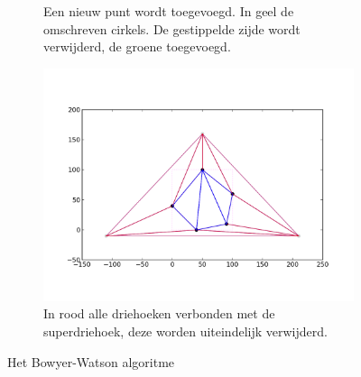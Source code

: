 \begin{figure}
\begin{subfigure}{0.4\textwidth}
		\caption{Een nieuw punt wordt toegevoegd. In geel de omschreven cirkels. De gestippelde zijde wordt verwijderd, de groene toegevoegd.}
		\label{bowyer-watson-b}
	\end{subfigure}
		\begin{subfigure}{0.4\textwidth}
		\includegraphics[width=\textwidth]{bowyer-watson_verwijderen}
		\caption{In rood alle driehoeken verbonden met de superdriehoek, deze worden uiteindelijk verwijderd.}
		\label{bowyer-watson-c}
	\end{subfigure}
	\caption{Het Bowyer-Watson algoritme \cite{Bowyer-WatsonWiki}}
	\label{bowyer-watson}
\end{figure}
